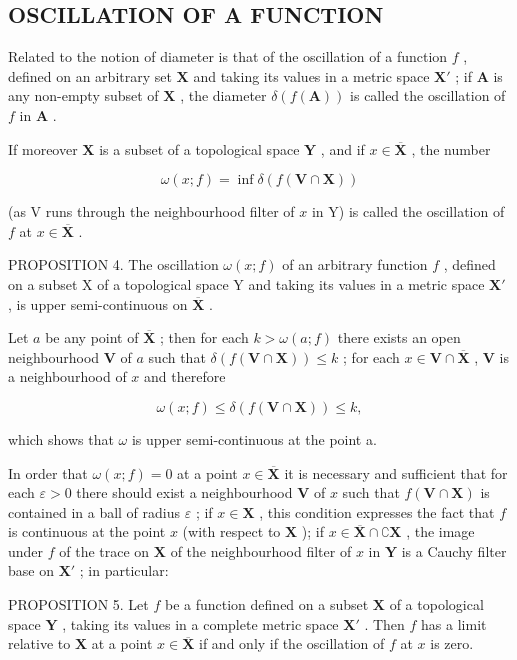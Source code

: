 \subsection{OSCILLATION OF A FUNCTION}

Related to the notion of diameter is that of the oscillation of a function \(f\) , defined on an arbitrary set \(\mathbf{X}\) and taking its values in a metric space \(\mathbf{X}'\) ; if \(\mathbf{A}\) is any non-empty subset of \(\mathbf{X}\) , the diameter \(\delta(f(\mathbf{A}))\) is called the oscillation of \(f\) in \(\mathbf{A}\) .

If moreover \(\mathbf{X}\) is a subset of a topological space \(\mathbf{Y}\) , and if \(x \in \overline{\mathbf{X}}\) , the number

\[
\omega (x; f) = \inf \delta (f (\mathbf {V} \cap \mathbf {X}))
\]

(as V runs through the neighbourhood filter of \(x\) in Y) is called the oscillation of \(f\) at \(x \in \overline{\mathbf{X}}\) .

PROPOSITION 4. The oscillation \(\omega(x; f)\) of an arbitrary function \(f\) , defined on a subset X of a topological space Y and taking its values in a metric space \(\mathbf{X}'\) , is upper semi-continuous on \(\overline{\mathbf{X}}\) .

Let \(a\) be any point of \(\overline{\mathbf{X}}\) ; then for each \(k > \omega(a; f)\) there exists an open neighbourhood \(\mathbf{V}\) of \(a\) such that \(\delta(f(\mathbf{V} \cap \mathbf{X})) \leqslant k\) ; for each \(x \in \mathbf{V} \cap \overline{\mathbf{X}}\) , \(\mathbf{V}\) is a neighbourhood of \(x\) and therefore

\[
\omega (x; f) \leqslant \delta (f (\mathbf {V} \cap \mathbf {X})) \leqslant k,
\]

which shows that \(\omega\) is upper semi-continuous at the point a.

In order that \(\omega(x; f) = 0\) at a point \(x \in \overline{\mathbf{X}}\) it is necessary and sufficient that for each \(\varepsilon > 0\) there should exist a neighbourhood \(\mathbf{V}\) of \(x\) such that \(f(\mathbf{V} \cap \mathbf{X})\) is contained in a ball of radius \(\varepsilon\) ; if \(x \in \mathbf{X}\) , this condition expresses the fact that \(f\) is continuous at the point \(x\) (with respect to \(\mathbf{X}\) ); if \(x \in \overline{\mathbf{X}} \cap \complement \mathbf{X}\) , the image under \(f\) of the trace on \(\mathbf{X}\) of the neighbourhood filter of \(x\) in \(\mathbf{Y}\) is a Cauchy filter base on \(\mathbf{X}'\) ; in particular:

PROPOSITION 5. Let \(f\) be a function defined on a subset \(\mathbf{X}\) of a topological space \(\mathbf{Y}\) , taking its values in a complete metric space \(\mathbf{X}'\) . Then \(f\) has a limit relative to \(\mathbf{X}\) at a point \(x \in \overline{\mathbf{X}}\) if and only if the oscillation of \(f\) at \(x\) is zero.

